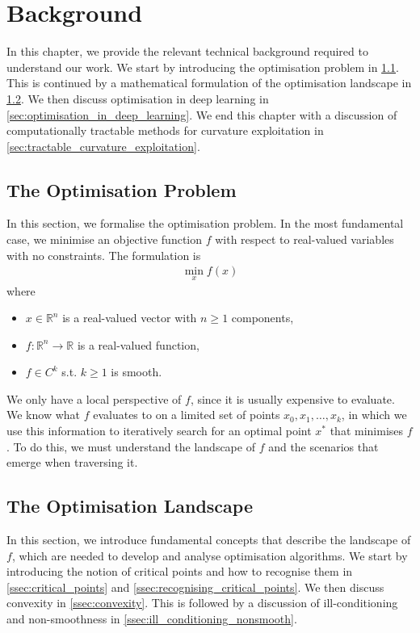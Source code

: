 \chapter{Background}
\label{chap:background}

In this chapter, we provide the relevant technical background required to understand our work. We start by introducing the optimisation problem in \cref{sec:optimisation_problem}. This is continued by a mathematical formulation of the optimisation landscape in \cref{sec:optimisation_landscape}. We then discuss optimisation in deep learning in \cref{sec:optimisation_in_deep_learning}. We end this chapter with a discussion of computationally tractable methods for curvature exploitation in \cref{sec:tractable_curvature_exploitation}.

\section{The Optimisation Problem}
\label{sec:optimisation_problem}

In this section, we formalise the optimisation problem. In the most fundamental case, we minimise an objective function $f$ with respect to real-valued variables with no constraints. The formulation is 
\begin{align}
    \min_{x} f(x)
\end{align}
where
\begin{itemize}
    \item $x \in \mathbb{R}^n$ is a real-valued vector with $n \geq 1$ components,
    \item $f: \mathbb{R}^n \to \mathbb{R}$ is a real-valued function,
    \item $f \in C^k$ s.t. $k \geq 1$ is smooth.
\end{itemize}
We only have a local perspective of $f$, since it is usually expensive to evaluate. We know what $f$ evaluates to on a limited set of points $x_0, x_1, \ldots, x_k$, in which we use this information to iteratively search for an optimal point $x^*$ that minimises $f$. To do this, we must understand the landscape of $f$ and the scenarios that emerge when traversing it.

\section{The Optimisation Landscape}
\label{sec:optimisation_landscape}
In this section, we introduce fundamental concepts that describe the landscape of $f$, which are needed to develop and analyse optimisation algorithms. We start by introducing the notion of critical points and how to recognise them in \cref{ssec:critical_points} and \cref{ssec:recognising_critical_points}. We then discuss convexity in \cref{ssec:convexity}. This is followed by a discussion of ill-conditioning and non-smoothness in \cref{ssec:ill_conditioning_nonsmooth}.

